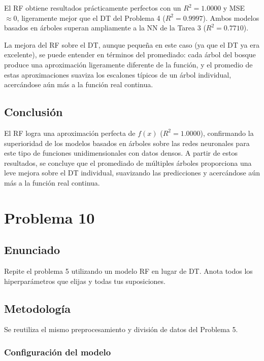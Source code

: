 \documentclass{article}
\begin{document}
El RF obtiene resultados prácticamente perfectos con un $R^2 = 1.0000$ y MSE $\approx 0$, ligeramente mejor que el DT del Problema 4 ($R^2 = 0.9997$). Ambos modelos basados en árboles superan ampliamente a la NN de la Tarea 3 ($R^2 = 0.7710$).

La mejora del RF sobre el DT, aunque pequeña en este caso (ya que el DT ya era excelente), se puede entender en términos del promediado: cada árbol del bosque produce una aproximación ligeramente diferente de la función, y el promedio de estas aproximaciones suaviza los escalones típicos de un árbol individual, acercándose aún más a la función real continua.

\subsection{Conclusión}

El RF logra una aproximación perfecta de $f(x)$ ($R^2 = 1.0000$), confirmando la superioridad de los modelos basados en árboles sobre las redes neuronales para este tipo de funciones unidimensionales con datos densos. A partir de estos resultados, se concluye que el promediado de múltiples árboles proporciona una leve mejora sobre el DT individual, suavizando las predicciones y acercándose aún más a la función real continua.

\section{Problema 10}

\subsection{Enunciado}

Repite el problema 5 utilizando un modelo RF en lugar de DT. Anota todos los hiperparámetros que elijas y todas tus suposiciones.

\subsection{Metodología}

Se reutiliza el mismo preprocesamiento y división de datos del Problema 5.

\subsubsection{Configuración del modelo}
\end{document}
